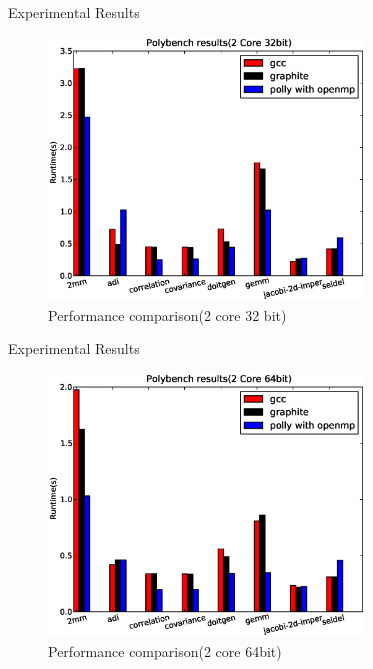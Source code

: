 \documentclass{beamer}
\begin{document}
\begin{frame}{Experimental Results}
\begin{figure}
\begin{center}
  \includegraphics[height=7cm]{images/2core32bit.eps}
  \caption{Performance comparison(2 core 32 bit)}
  \label{fig:2core1}
\end{center}
\end{figure}
\end{frame}

\begin{frame}{Experimental Results}
\begin{figure}
\begin{center}
  \includegraphics[height=7cm]{images/2core64bit.eps}
  \caption{Performance comparison(2 core 64bit)}
  \label{fig:2core2}
\end{center}
\end{figure}
\end{frame}
\end{document}
